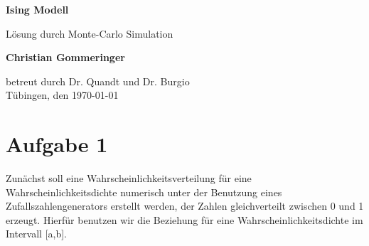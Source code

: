 \documentclass[12pt]{article}
\begin{document}
\newcommand{\half}{\frac{1}{2}}
\begin{titlepage}
    \begin{center}
        \vspace*{1cm}
            
        \Huge
        \textbf{Ising Modell}
            
        
        \large
        
            
        \vspace{0.7cm}
            Lösung durch Monte-Carlo Simulation
        \vspace{2cm}
        

        \textbf{Christian Gommeringer}
            
        \vspace*{7cm}
        
        
            
        
              
        
            
        
            
        \normalsize
        betreut durch Dr. Quandt und Dr. Burgio\\
        \vspace*{1cm}
        Tübingen, den \today
        
            
    \end{center}
\end{titlepage}


\section*{Aufgabe 1}
Zunächst soll eine Wahrscheinlichkeitsverteilung für eine Wahrscheinlichkeitsdichte numerisch unter der Benutzung eines Zufallszahlengenerators erstellt werden, der Zahlen gleichverteilt zwischen 0 und 1 erzeugt. Hierfür benutzen wir die Beziehung für eine Wahrscheinlichkeitsdichte im Intervall [a,b].
\end{document}
